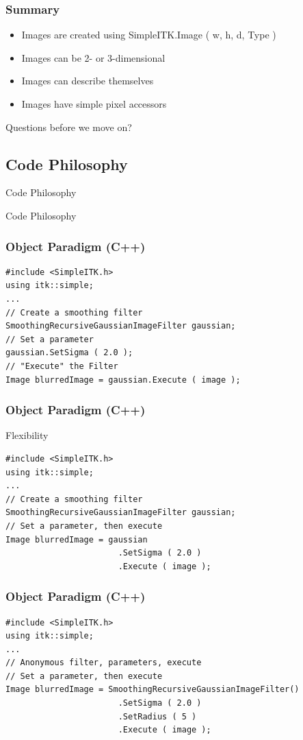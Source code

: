 \begin{frame}[fragile]
\frametitle{Summary}
\begin{itemize}
  \item Images are created using SimpleITK.Image ( w, h, d, Type )
  \item Images can be 2- or 3-dimensional
  \item Images can describe themselves
  \item Images have simple pixel accessors
\end{itemize}
Questions before we move on?
\end{frame}

\subsection{Code Philosophy}
\begin{frame}{Code Philosophy}
\fontsize{36pt}{36pt}\selectfont
\center
\begin{center}
Code Philosophy
\end{center}
\end{frame}

\begin{frame}[fragile]
\frametitle{Object Paradigm (C++)}
\lstcpp
\begin{lstlisting}
#include <SimpleITK.h>
using itk::simple;
...
// Create a smoothing filter
SmoothingRecursiveGaussianImageFilter gaussian;
// Set a parameter
gaussian.SetSigma ( 2.0 );
// "Execute" the Filter
Image blurredImage = gaussian.Execute ( image );
\end{lstlisting}
\end{frame}

\begin{frame}[fragile]
\frametitle{Object Paradigm (C++)}
Flexibility
\lstcpp
\begin{lstlisting}
#include <SimpleITK.h>
using itk::simple;
...
// Create a smoothing filter
SmoothingRecursiveGaussianImageFilter gaussian;
// Set a parameter, then execute
Image blurredImage = gaussian
                       .SetSigma ( 2.0 )
                       .Execute ( image );
\end{lstlisting}
\end{frame}

\begin{frame}[fragile]
\frametitle{Object Paradigm (C++)}
\lstcpp
\begin{lstlisting}
#include <SimpleITK.h>
using itk::simple;
...
// Anonymous filter, parameters, execute
// Set a parameter, then execute
Image blurredImage = SmoothingRecursiveGaussianImageFilter()
                       .SetSigma ( 2.0 )
                       .SetRadius ( 5 )
                       .Execute ( image );
\end{lstlisting}
\end{frame}

